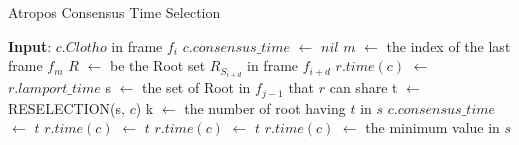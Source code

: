 \documentclass[preprint,12pt]{elsarticle}
\begin{document}
\begin{algorithm}[H]
\caption{Atropos Consensus Time Selection}\label{al:atc}
\begin{algorithmic}[1]
    \State \textbf{Input}: $c.Clotho$ in frame $f_i$
    \State$c.consensus\_time$ $\leftarrow$ $nil$
    \State$m$ $\leftarrow$ the index of the last frame $f_m$
    	\State $R$ $\leftarrow$ be the Root set $R_{S_{i+d}}$ in frame $f_{i+d}$
                    \State $r.time(c)$ $\leftarrow$ $r.lamport\_time$
                \EndIf
                \State s $\leftarrow$ the set of Root in $f_{j-1}$ that $r$ can share
                \State t $\leftarrow$ RESELECTION(s, $c$)
                \State k $\leftarrow$ the number of root having $t$ in $s$
                        \State $c.consensus\_time$ $\leftarrow$ $t$
                        \State $r.time(c)$ $\leftarrow$ $t$
                    \Else
                        \State $r.time(c)$ $\leftarrow$ $t$
                    \EndIf
                \Else
                    \State $r.time(c)$ $\leftarrow$ the minimum value in $s$
                \EndIf
            \EndIf
        \EndFor
    \EndFor
\EndProcedure
\end{algorithmic}
\end{algorithm}
\end{document}
